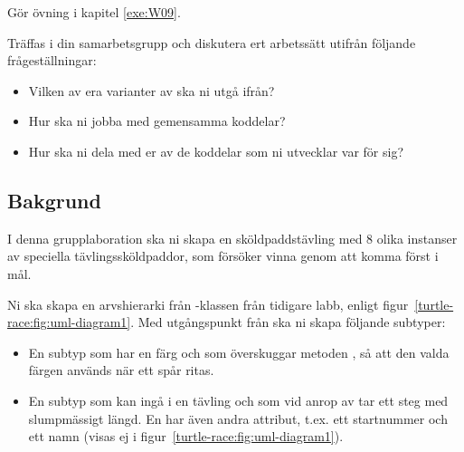 

\Teamlab{\LabWeekNINE}

\begin{Goals}

\end{Goals}

\begin{Preparations}
\item Gör övning {\tt \ExeWeekNINE} i kapitel \ref{exe:W09}.

\item Träffas i din samarbetsgrupp och diskutera ert arbetssätt utifrån följande frågeställningar:
\begin{itemize}
  \item Vilken av era varianter av  ska ni utgå ifrån?
  \item Hur ska ni jobba med gemensamma koddelar?
  \item Hur ska ni dela med er av de koddelar som ni utvecklar var för sig?
\end{itemize}

\end{Preparations}

\subsection{Bakgrund}

I denna grupplaboration ska ni skapa en sköldpaddstävling med 8 olika instanser av speciella tävlingssköldpaddor, som försöker vinna genom att komma först i mål.

Ni ska skapa en arvshierarki från -klassen från tidigare labb, enligt figur~\ref{turtle-race:fig:uml-diagram1}.
Med utgångspunkt från  ska ni skapa följande subtyper:
\begin{itemize}
  \item En subtyp  som har en färg och som överskuggar metoden , så att den valda färgen används när ett spår ritas.
  \item En subtyp  som kan ingå i en tävling och som vid anrop av  tar ett steg med slumpmässigt längd. En  har även andra attribut, t.ex. ett startnummer  och ett namn  (visas ej i figur~\ref{turtle-race:fig:uml-diagram1}).
\end{itemize}

